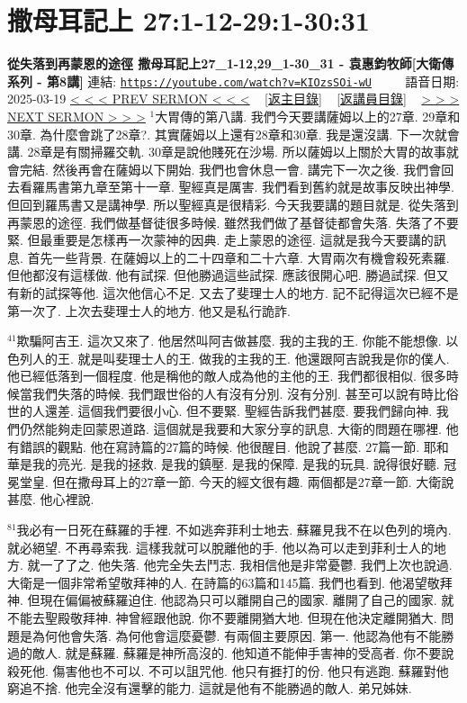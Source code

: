 \documentclass{book}
\begin{document}
\section{撒母耳記上 27:1-12-29:1-30:31}
\label{sec:KIOzsSOi_wU}
\textbf{從失落到再蒙恩的途徑 撒母耳記上27\_1-12,29\_1-30\_31 - 袁惠鈞牧師[大衛傳系列 - 第8講]}
\newline
\newline
連結: \href{https://youtube.com/watch?v=KIOzsSOi-wU}{\texttt{https://youtube.com/watch?v=KIOzsSOi-wU}} ~~~~ 語音日期: 2025-03-19
\newline
\newline
\hyperref[sec:86NlAlqZbEc]{< < < PREV SERMON < < <}
~
\hyperlink{toc}{[返主目錄]}
~
\hyperref[ch:preacher12]{[返講員目錄]}
~
\hyperref[sec:9ORA5941xxk]{> > > NEXT SERMON > > >}
\newline
\newline
$^{1}$大胃傳的第八講.
我們今天要講薩姆以上的27章.
29章和30章.
為什麼會跳了28章?.
其實薩姆以上還有28章和30章.
我是還沒講.
下一次就會講.
28章是有關掃羅交軌.
30章是說他賤死在沙場.
所以薩姆以上關於大胃的故事就會完結.
然後再會在薩姆以下開始.
我們也會休息一會.
講完下一次之後.
我們會回去看羅馬書第九章至第十一章.
聖經真是厲害.
我們看到舊約就是故事反映出神學.
但回到羅馬書又是講神學.
所以聖經真是很精彩.
今天我要講的題目就是.
從失落到再蒙恩的途徑.
我們做基督徒很多時候.
雖然我們做了基督徒都會失落.
失落了不要緊.
但最重要是怎樣再一次蒙神的因典.
走上蒙恩的途徑.
這就是我今天要講的訊息.
首先一些背景.
在薩姆以上的二十四章和二十六章.
大胃兩次有機會殺死素羅.
但他都沒有這樣做.
他有試探.
但他勝過這些試探.
應該很開心吧.
勝過試探.
但又有新的試探等他.
這次他信心不足.
又去了斐理士人的地方.
記不記得這次已經不是第一次了.
上次去斐理士人的地方.
他又是私行詭詐.

$^{41}$欺騙阿吉王.
這次又來了.
他居然叫阿吉做甚麼.
我的主我的王.
你能不能想像.
以色列人的王.
就是叫斐理士人的王.
做我的主我的王.
他還跟阿吉說我是你的僕人.
他已經低落到一個程度.
他是稱他的敵人成為他的主他的王.
我們都很相似.
很多時候當我們失落的時候.
我們跟世俗的人有沒有分別.
沒有分別.
甚至可以說有時比俗世的人還差.
這個我們要很小心.
但不要緊.
聖經告訴我們甚麼.
要我們歸向神.
我們仍然能夠走回蒙恩道路.
這個就是我要和大家分享的訊息.
大衛的問題在哪裡.
他有錯誤的觀點.
他在寫詩篇的27篇的時候.
他很醒目.
他說了甚麼.
27篇一節.
耶和華是我的亮光.
是我的拯救.
是我的鎮壓.
是我的保障.
是我的玩具.
說得很好聽.
冠冕堂皇.
但在撒母耳上的27章一節.
今天的經文很有趣.
兩個都是27章一節.
大衛說甚麼.
他心裡說.

$^{81}$我必有一日死在蘇羅的手裡.
不如逃奔菲利士地去.
蘇羅見我不在以色列的境內.
就必絕望.
不再尋索我.
這樣我就可以脫離他的手.
他以為可以走到菲利士人的地方.
就一了了之.
他失落.
他完全失去鬥志.
我相信他是非常憂鬱.
我們上次也說過.
大衛是一個非常希望敬拜神的人.
在詩篇的63篇和145篇.
我們也看到.
他渴望敬拜神.
但現在偏偏被蘇羅迫住.
他認為只可以離開自己的國家.
離開了自己的國家.
就不能去聖殿敬拜神.
神曾經跟他說.
你不要離開猶大地.
但現在他決定離開猶大.
問題是為何他會失落.
為何他會這麼憂鬱.
有兩個主要原因.
第一.
他認為他有不能勝過的敵人.
就是蘇羅.
蘇羅是神所高沒的.
他知道不能伸手害神的受高者.
你不要說殺死他.
傷害他也不可以.
不可以詛咒他.
他只有捱打的份.
他只有逃跑.
蘇羅對他窮追不捨.
他完全沒有還擊的能力.
這就是他有不能勝過的敵人.
弟兄姊妹.
\end{document}
